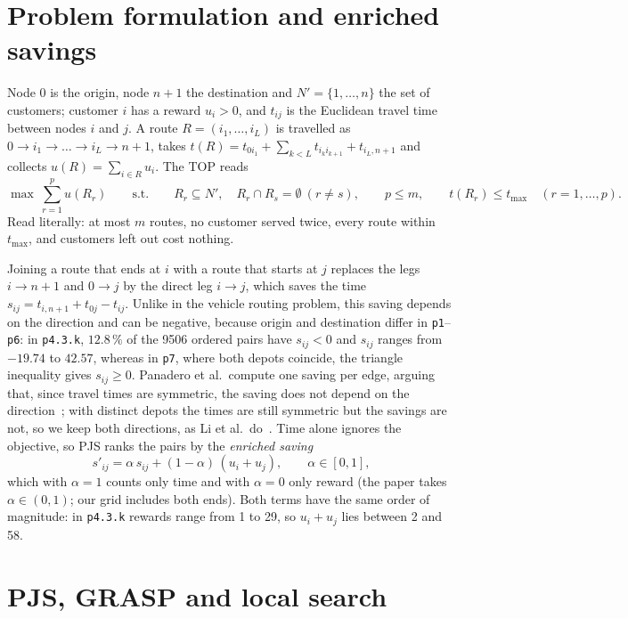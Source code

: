 \documentclass[10pt,a4paper]{article}
\begin{document}
\section{Problem formulation and enriched savings}
\label{sec:model}

Node $0$ is the origin, node $n+1$ the destination and $N'=\{1,\dots,n\}$ the set of customers; customer
$i$ has a reward $u_i>0$, and $t_{ij}$ is the Euclidean travel time between nodes $i$ and $j$. A route
$R=(i_1,\dots,i_L)$ is travelled as $0\to i_1\to\dots\to i_L\to n+1$, takes
$t(R)=t_{0i_1}+\sum_{k<L}t_{i_ki_{k+1}}+t_{i_L,n+1}$ and collects $u(R)=\sum_{i\in R}u_i$. The TOP reads
\begin{equation}
\max\ \sum_{r=1}^{p} u(R_r)
\qquad\text{s.t.}\qquad
R_r\subseteq N',\quad R_r\cap R_s=\emptyset\ (r\neq s),\qquad p\le m,\qquad
t(R_r)\le t_{\max}\quad (r=1,\dots,p).
\label{eq:model}
\end{equation}
Read literally: at most $m$ routes, no customer served twice, every route within $t_{\max}$, and
customers left out cost nothing.

Joining a route that ends at $i$ with a route that starts at $j$ replaces the legs $i\to n+1$ and $0\to
j$ by the direct leg $i\to j$, which saves the time $s_{ij}=t_{i,n+1}+t_{0j}-t_{ij}$. Unlike in the
vehicle routing problem, this saving depends on the direction and can be negative, because origin and
destination differ in \texttt{p1}--\texttt{p6}: in \texttt{p4.3.k}, $12.8\,\%$ of the 9506 ordered pairs
have $s_{ij}<0$ and $s_{ij}$ ranges from $-19.74$ to $42.57$, whereas in \texttt{p7}, where both depots
coincide, the triangle inequality gives $s_{ij}\ge0$. Panadero et al.\ compute one saving per edge,
arguing that, since travel times are symmetric, the saving does not depend on the
direction~\cite{panadero2021}; with distinct depots the times are still symmetric but the savings are
not, so we keep both directions, as Li et al.\ do~\cite{li2022}. Time alone ignores the objective, so PJS
ranks the pairs by the \emph{enriched saving}
\begin{equation}
s'_{ij}=\alpha\,s_{ij}+(1-\alpha)\,(u_i+u_j),\qquad \alpha\in[0,1],
\label{eq:savings}
\end{equation}
which with $\alpha=1$ counts only time and with $\alpha=0$ only reward (the paper takes
$\alpha\in(0,1)$; our grid includes both ends). Both terms have the same order of magnitude: in
\texttt{p4.3.k} rewards range from 1 to 29, so $u_i+u_j$ lies between 2 and 58.

\section{PJS, GRASP and local search}
\label{sec:method}
\end{document}
